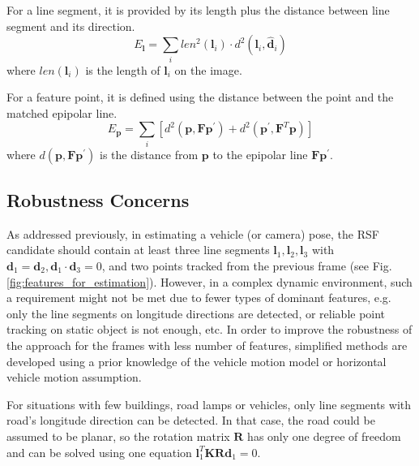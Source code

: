 \documentclass[letterpaper, 10 pt, conference]{ieeeconf}  %
\begin{document}
For a line segment, it is provided by its length plus the distance between line segment and its direction.
\begin{equation}
E_\mathbf{l} = \sum_{i} len^2(\mathbf{l}_i) \cdot d^2(\mathbf{l}_i,\hat{\mathbf{d}}_i)
\end{equation}
where $len(\mathbf{l}_i)$ is the length of $\mathbf{l}_i$ on the image.

For a feature point, it is defined using the distance between the point and the matched epipolar line.
\begin{equation}
E_\mathbf{p} = \sum_{i} \left[ d^2 (\mathbf{p}, \mathbf{F} \mathbf{p}^\prime)
+ d^2 (\mathbf{p}^\prime, \mathbf{F}^T\mathbf{p})\right]
\end{equation}
where $d (\mathbf{p}, \mathbf{F} \mathbf{p}^\prime)$ is the distance from $\mathbf{p}$ to the epipolar line $\mathbf{F} \mathbf{p}^\prime$.

\subsection{Robustness Concerns}
As addressed previously, in estimating a vehicle (or camera) pose, the RSF candidate should contain at least three line segments $\mathbf{l}_1,\mathbf{l}_2,\mathbf{l}_3$ with $\mathbf{d}_1=\mathbf{d}_2,\mathbf{d}_1\cdot \mathbf{d}_3=0$, and two points tracked from the previous frame (see Fig. \ref{fig:features_for_estimation}).
However, in a complex dynamic environment, such a requirement might not be met due to fewer types of dominant features, e.g. only the line segments on longitude directions are detected, or reliable point tracking on static object is not enough, etc. In order to improve the robustness of the approach for the frames with less number of features, simplified methods are developed using a prior knowledge of the vehicle motion model or horizontal vehicle motion assumption.

For situations with few buildings, road lamps or vehicles, only line segments with road's longitude direction can be detected. In that case, the road could be assumed to be planar, so the rotation matrix $\mathbf{R}$ has only one degree of freedom and can be solved using one equation $\mathbf{l}_1^T\mathbf{K}\mathbf{R}\mathbf{d}_1=0$.
\end{document}
